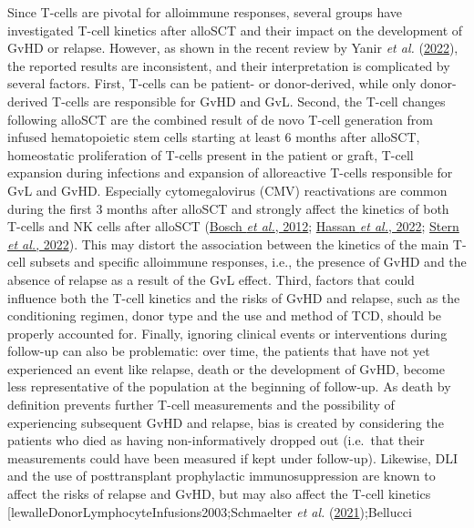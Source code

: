 \documentclass[
  letterpaper,
  DIV=11,
  numbers=noendperiod]{scrreprt}
\begin{document}
Since T-cells are pivotal for alloimmune responses, several groups have
investigated T-cell kinetics after alloSCT and their impact on the
development of GvHD or relapse. However, as shown in the recent review
by Yanir \emph{et al.}
(\protect\hyperlink{ref-yanirImmuneReconstitutionAllogeneic2022}{2022}),
the reported results are inconsistent, and their interpretation is
complicated by several factors. First, T-cells can be patient- or
donor-derived, while only donor-derived T-cells are responsible for GvHD
and GvL. Second, the T-cell changes following alloSCT are the combined
result of de novo T-cell generation from infused hematopoietic stem
cells starting at least 6 months after alloSCT, homeostatic
proliferation of T-cells present in the patient or graft, T-cell
expansion during infections and expansion of alloreactive T-cells
responsible for GvL and GvHD. Especially cytomegalovirus (CMV)
reactivations are common during the first 3 months after alloSCT and
strongly affect the kinetics of both T-cells and NK cells after alloSCT
(\protect\hyperlink{ref-boschImmuneReconstitutionAntithymocyte2012a}{Bosch
\emph{et al.}, 2012};
\protect\hyperlink{ref-hassanCMVReactivationInitiates2022}{Hassan
\emph{et al.}, 2022};
\protect\hyperlink{ref-sternImmunoprofilingRevealsCell2022}{Stern
\emph{et al.}, 2022}). This may distort the association between the
kinetics of the main T-cell subsets and specific alloimmune responses,
i.e., the presence of GvHD and the absence of relapse as a result of the
GvL effect. Third, factors that could influence both the T-cell kinetics
and the risks of GvHD and relapse, such as the conditioning regimen,
donor type and the use and method of TCD, should be properly accounted
for. Finally, ignoring clinical events or interventions during follow-up
can also be problematic: over time, the patients that have not yet
experienced an event like relapse, death or the development of GvHD,
become less representative of the population at the beginning of
follow-up. As death by definition prevents further T-cell measurements
and the possibility of experiencing subsequent GvHD and relapse, bias is
created by considering the patients who died as having non-informatively
dropped out (i.e.~that their measurements could have been measured if
kept under follow-up). Likewise, DLI and the use of posttransplant
prophylactic immunosuppression are known to affect the risks of relapse
and GvHD, but may also affect the T-cell kinetics
{[}lewalleDonorLymphocyteInfusions2003;Schmaelter \emph{et al.}
(\protect\hyperlink{ref-schmaelterAlterationsPeripheralBlood2021}{2021});Bellucci
\end{document}
